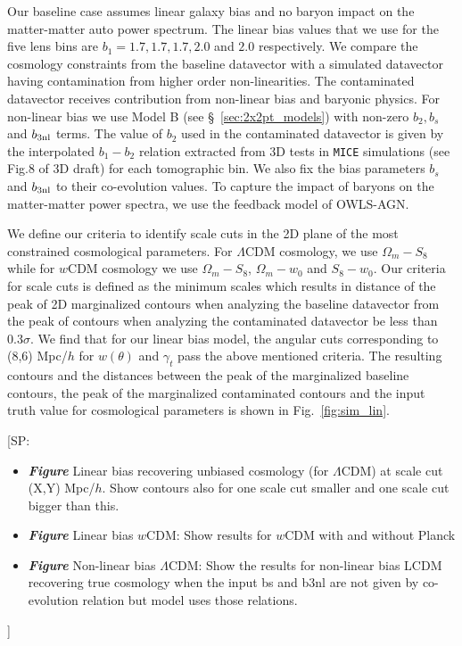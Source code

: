 \documentclass[fleqn,usenatbib]{mnras}
\newcommand{\mice}{\texttt{MICE} }
\newcommand{\SP}[1]{{\color{red}[SP: #1]}}
\begin{document}
Our baseline case assumes linear galaxy bias and no baryon impact on the matter-matter auto power spectrum. The linear bias values that we use for the five lens bins are $b_1 = 1.7, 1.7, 1.7, 2.0$ and  $2.0$  respectively. We compare the cosmology constraints from the baseline datavector with a simulated datavector having contamination from higher order non-linearities. The contaminated datavector receives contribution from non-linear bias and baryonic physics. For non-linear bias we use  Model B (see \S~\ref{sec:2x2pt_models}) with non-zero $b_2, b_s$ and $b_{\rm 3nl}$ terms. The value of $b_2$ used in the contaminated datavector is given by the interpolated $b_1-b_2$ relation extracted from 3D tests in \mice simulations (see Fig.8 of 3D draft) for each tomographic bin. We also fix the bias parameters $b_s$ and $b_{\rm 3nl}$ to their co-evolution values. To capture the impact of baryons on the matter-matter power spectra, we use the feedback model of OWLS-AGN.

We define our criteria to identify  scale cuts in the 2D plane of the most constrained cosmological parameters. For $\Lambda$CDM cosmology, we use $\Omega_m - S_8$ while for $w$CDM cosmology we use $\Omega_m-S_8$, $\Omega_m-w_0$ and $S_8-w_0$. Our criteria for scale cuts is defined as the minimum scales which results in distance of the peak of 2D marginalized contours when analyzing the baseline datavector from the peak of contours when analyzing the contaminated datavector be less than 0.3$\sigma$. We find that for our linear bias model, the angular cuts corresponding to (8,6) Mpc/$h$ for $w(\theta)$ and $\gamma_t$ pass the above mentioned criteria. The resulting contours and the distances between the peak of the marginalized baseline contours, the peak of the marginalized contaminated contours and the input truth value for cosmological parameters is shown in Fig.~\ref{fig:sim_lin}. 

\SP{\begin{itemize}
    \item \textbf{\textit{Figure}} Linear bias recovering unbiased cosmology (for $\Lambda$CDM) at scale cut (X,Y) Mpc/$h$. Show contours also for one scale cut smaller and one scale cut bigger than this. 
    \item \textbf{\textit{Figure}} Linear bias $w$CDM: Show results for $w$CDM with and without Planck
    \item \textbf{\textit{Figure}} Non-linear bias $\Lambda$CDM: Show the results for non-linear bias LCDM recovering true cosmology when the input bs and b3nl are not given by co-evolution relation but model uses those relations.
\end{itemize}
}
\end{document}
